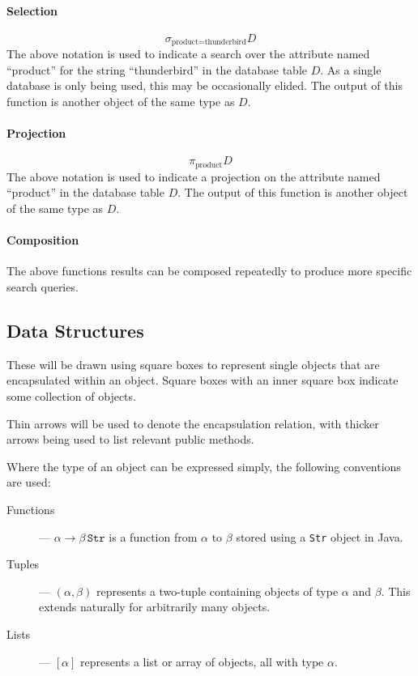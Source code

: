 \paragraph{Selection} \[\sigma_{\text{product}=\text{thunderbird}}D\]
The above notation is used to indicate a search over the attribute named
``product'' for the string ``thunderbird'' in the database table $D$.  As a
single database is only being used, this may be occasionally elided.  The output
of this function is another object of the same type as $D$.

\paragraph{Projection}
\[\pi_{\text{product}}D\]
The above notation is used to indicate a projection on the attribute named
``product'' in the database table $D$.  The output of this function is another
object of the same type as $D$.

\paragraph{Composition}
The above functions results can be composed repeatedly to produce more specific
search queries.

\subsection{Data Structures}
These will be drawn using square boxes to represent single objects that are encapsulated
within an object.  Square boxes with an inner square box indicate some collection
of objects.

Thin arrows will be used to denote the encapsulation relation, with thicker
arrows being used to list relevant public methods.

Where the type of an object can be expressed simply, the following conventions are used:
\begin{description}
	\item [Functions] --- $\alpha \rightarrow \beta \, \texttt{Str}$ is a function from $\alpha$ to $\beta$ stored using a \texttt{Str} object in Java.
	\item [Tuples] --- $(\alpha, \beta)$ represents a two-tuple containing objects of type $\alpha$ and $\beta$.  This extends naturally for arbitrarily many objects.
	\item [Lists] --- $[\alpha]$ represents a list or array of objects, all with type $\alpha$.
\end{description}

